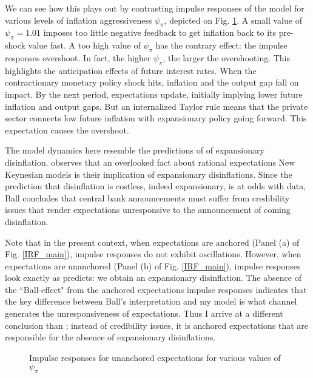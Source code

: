 \documentclass[11pt]{article}
\def \myFigPath {../../figures/}
\renewcommand{\[}{\begin{equation}}
\renewcommand{\]}{\end{equation}}
\def\fignameIRFpsipiSmall{RIR_unanch_psi_pi1_01_command_IRFs_approx_pretty_2020_09_17}
\def\fignameIRFpsipiMedium{RIR_unanch_psi_pi1_5_command_IRFs_approx_pretty_2020_09_17}
\def\fignameIRFpsipiBig{RIR_unanch_psi_pi2_command_IRFs_approx_pretty_2020_09_17}
\begin{document}
We can see how this plays out by contrasting impulse responses of the model for various levels of inflation aggressiveness $\psi_{\pi}$, depicted on Fig. \ref{IRF_unanchored_psi_main}. A small value of $\psi_{\pi} = 1.01$ imposes too little negative feedback to get inflation back to its pre-shock value fast. A too high value of $\psi_{\pi}$ has the contrary effect: the impulse responses overshoot. In fact, the higher $\psi_{\pi}$, the larger the overshooting. This highlights the anticipation effects of future interest rates. When the contractionary monetary policy shock hits, inflation and the output gap fall on impact. By the next period, expectations update, initially implying lower future inflation and output gaps. But an internalized Taylor rule means that the private sector connects low future inflation with expansionary policy going forward. This expectation causes the overshoot.

The model dynamics here resemble the predictions of \cite{ball1994credible} of expansionary disinflation. \cite{ball1994credible} observes that an overlooked fact about rational expectations New Keynesian models is their implication of expansionary disinflations. Since the prediction that disinflation is costless, indeed expansionary, is at odds with data, Ball concludes that central bank announcements must suffer from credibility issues that render expectations unresponsive to the announcement of coming disinflation.

Note that in the present context, when expectations are anchored (Panel (a) of Fig. \ref{IRF_main}), impulse responses do not exhibit oscillations. However, when expectations are unanchored (Panel (b) of Fig. \ref{IRF_main}), impulse responses look exactly as \cite{ball1994credible} predicts: we obtain an expansionary disinflation. The absence of the ``Ball-effect" from the anchored expectations impulse responses indicates that the key difference between Ball's interpretation and my model is what channel generates the unresponsiveness of expectations. Thus I arrive at a different conclusion than \cite{ball1994credible}; instead of credibility issues, it is anchored expectations that are responsible for the absence of expansionary disinflations.

\begin{figure}[h!]
\caption{Impulse responses for unanchored expectations for various values of $\psi_{\pi}$}
\label{IRF_unanchored_psi_main}
\end{figure}
\end{document}
